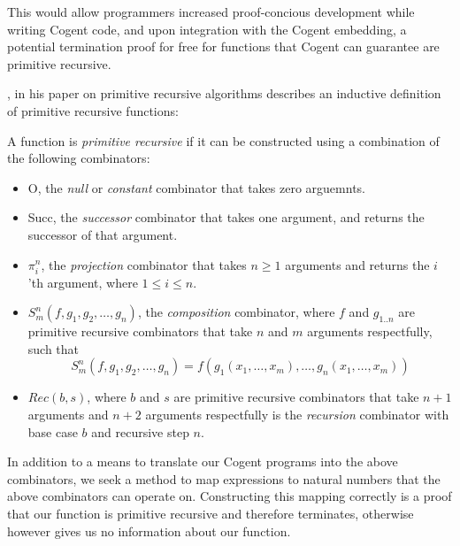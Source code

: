 This would allow programmers increased proof-concious development while writing Cogent code,
and upon integration with the Cogent embedding, a potential termination proof for free for
functions that Cogent can guarantee are primitive recursive.

\citet{AboutPrimrecAlgorithms}, in his paper on primitive recursive algorithms describes
an inductive definition of primitive recursive functions:

\theoremstyle{definition}
\begin{definition}
    \label{def:primrec}
    A function is \textit{primitive recursive} if it can be constructed using 
    a combination of the following combinators:

    \begin{itemize}
        \item 
            \textsf{O}, the \textit{null} or \textit{constant} combinator that takes zero arguemnts.
        \item 
            \textsf{Succ}, the \textit{successor} combinator that takes one argument, and returns the successor
            of that argument.
        \item 
            \textsf{$\pi^n_i$}, the \textit{projection} combinator that takes $n \geq 1$ arguments and returns
            the $i$'th argument, where $1 \leq i \leq n$.
        \item 
            \textsf{$S^n_m(f, g_1, g_2, \dots, g_n)$}, the \textit{composition} combinator, where $f$ and $g_{1..n}$ are 
            primitive recursive combinators that take $n$ and $m$ arguments respectfully, such that 
                $$S^n_m(f, g_1, g_2, \dots, g_n) = f(g_1(x_1, \dots, x_m), \dots, g_n(x_1, \dots, x_m))$$
        \item 
            \textsf{$Rec(b,s)$}, where $b$ and $s$ are primitive recursive combinators that take
            $n + 1$ arguments and $n + 2$ arguments respectfully is the \textit{recursion}
            combinator with base case $b$ and recursive step $n$.
    \end{itemize}
\end{definition}

In addition to a means to translate our Cogent programs into the above combinators,
we seek a method to map expressions to natural numbers that the above combinators can
operate on. Constructing this mapping correctly is a proof that our function is primitive recursive and
therefore terminates, otherwise however gives us no information about our function.

